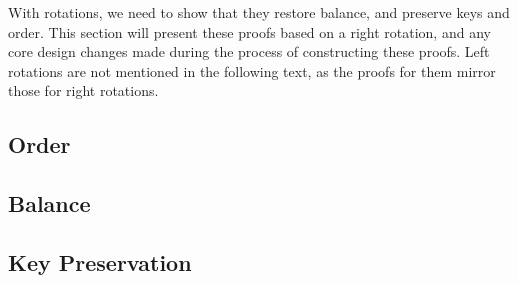 With rotations, we need to show that they restore balance, and preserve keys and order. This section will present these proofs based on a right rotation, and any core design changes made during the process of constructing these proofs. Left rotations are not mentioned in the following text, as the proofs for them mirror those for right rotations.

\subsection*{Order}


\subsection*{Balance}


\subsection*{Key Preservation}
